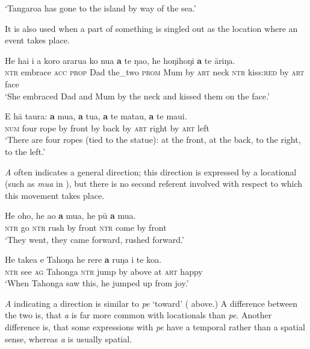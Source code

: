 \glt
‘Tangaroa has gone to the island by way of the sea.’ \textstyleExampleref{[Ley-1-06.007]}
\z

It is also used when a part of something is singled out as the location where an event takes place. 

\ea\label{ex:4.280}
\gll He ha{\ꞌ}i i a koro ararua ko nua \textbf{a} te ŋao, he hoŋihoŋi \textbf{a} te {\ꞌ}āriŋa.\\
\textsc{ntr} embrace \textsc{acc} \textsc{prop} Dad the\_two \textsc{prom} Mum by \textsc{art} neck \textsc{ntr} kiss:\textsc{red} by \textsc{art} face\\

\glt 
‘She embraced Dad and Mum by the neck and kissed them on the face.’ \textstyleExampleref{[R210.012]} 
\z

\ea\label{ex:4.281}
\gll E hā taura: \textbf{a} mu{\ꞌ}a, \textbf{a} tu{\ꞌ}a, \textbf{a} te mata{\ꞌ}u, \textbf{a} te maui.\\
\textsc{num} four rope by front by back by \textsc{art} right by \textsc{art} left\\

\glt 
‘There are four ropes (tied to the statue): at the front, at the back, to the right, to the left.’ \textstyleExampleref{[Ley-5-29.010–011]}
\z

\textit{A} often indicates a general direction; this direction is expressed by a locational (such as \textit{mu{\ꞌ}a} in ), but there is no second referent involved with respect to which this movement takes place. 

\ea\label{ex:4.282}
\gll He oho, he ao \textbf{a} mu{\ꞌ}a, he pū \textbf{a} mu{\ꞌ}a. \\
\textsc{ntr} go \textsc{ntr} rush by front \textsc{ntr} come by front \\

\glt 
‘They went, they came forward, rushed forward.’ \textstyleExampleref{[Ley-4-05.012]}
\z

\ea\label{ex:4.283}
\gll He take{\ꞌ}a e Tahoŋa he rere \textbf{a} ruŋa {\ꞌ}i te koa. \\
\textsc{ntr} see \textsc{ag} Tahonga \textsc{ntr} jump by above at \textsc{art} happy \\

\glt
‘When Tahonga saw this, he jumped up from joy.’ \textstyleExampleref{[R301.210]} 
\z

\textit{A} indicating a direction is similar to \textit{pe} ‘toward’ ( above.)\textstyleExampleref{} A difference between the two is, that \textit{a} is far more common with locationals than \textit{pe}. Another difference is, that some expressions with \textit{pe} have a temporal rather than a spatial sense, whereas \textit{a} is usually spatial.

